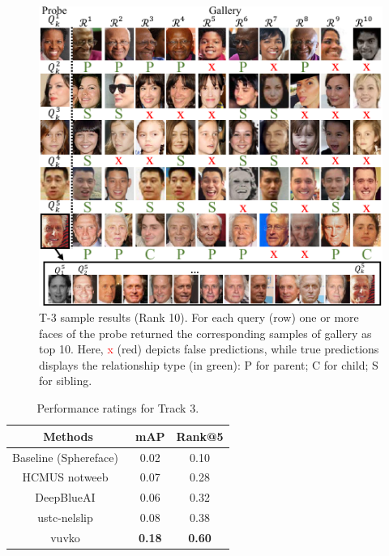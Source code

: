 \documentclass[letterpaper, 10 pt, conference]{ieeeconf}
\begin{document}
\begin{figure}[t!]
    \centering
    \includegraphics[width = .85\linewidth]{figures/track3-samples-crop.pdf}
    \caption{T-3 sample results (Rank 10). For each query (row) one or more faces of the probe returned the corresponding samples of gallery as top 10. Here, \textcolor{red}{x} (red) depicts false predictions, while true predictions displays the relationship type (in green): \textcolor{ao(english)}{P} for parent; \textcolor{ao(english)}{C} for child; \textcolor{ao(english)}{S} for sibling.}
    \label{fig:track3:montage}
    \vspace{-5mm}
\end{figure}
\begin{table}[b!]
	\centering
	\caption{Performance ratings for Track 3.}
	\begin{tabular}{c|cc} 
	      \textbf{Methods}  &\textbf{mAP} & \textbf{Rank@5} \\ \hline %
		  Baseline (Sphereface)~\cite{Liu_2017_CVPR} & 0.02 & 0.10	\\
		  HCMUS notweeb~\cite{id9} & 0.07 & 0.28	\\
		  DeepBlueAI~\cite{id3} & 0.06 & 0.32	\\
		  ustc-nelslip~\cite{id8} & 0.08 & 0.38	\\
		  vuvko~\cite{id4} & \textbf{0.18} & \textbf{0.60}	\\
	\end{tabular}
	\label{tbl:t3:benchmarks}
\end{table}
\end{document}
